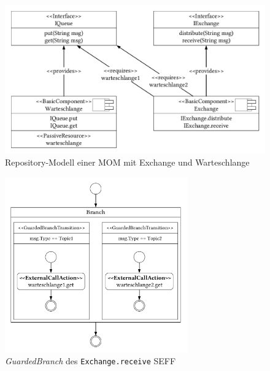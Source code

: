 \begin{figure}
\center
  \includegraphics[width=1\textwidth]{images/modelling/modelingRepository.pdf}
  \caption{Repository-Modell einer MOM mit Exchange und Warteschlange}
  \label{img:mom_repository}
\end{figure}

\begin{figure}
\center
  \includegraphics[width=0.7\textwidth]{images/modelling/modelingGuardedBranch.pdf}
  \caption{\emph{GuardedBranch} des \texttt{Exchange.receive} SEFF}
  \label{img:queueBranch}
\end{figure}

